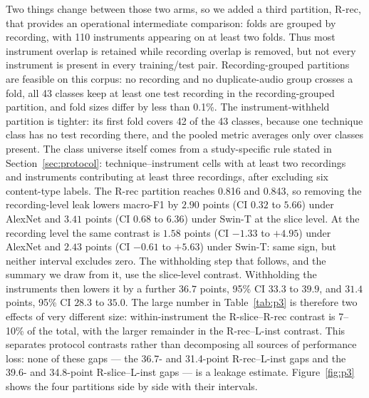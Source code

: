 Two things change between those two arms, so we added a third partition, R-rec, that
provides an operational intermediate comparison: folds are grouped by recording, with 110
instruments appearing on at least two folds. Thus most instrument overlap is retained while
recording overlap is removed, but not every instrument is present in every training/test pair.
Recording-grouped partitions are feasible on this corpus: no recording and no duplicate-audio group
crosses a fold, all 43 classes keep at least one test recording in the recording-grouped partition,
and fold sizes differ by less than 0.1\%. The instrument-withheld partition is tighter: its first
fold covers 42 of the 43 classes, because one technique class has no test recording there, and the
pooled metric averages only over classes present. The class universe itself comes from a
study-specific rule stated in Section~\ref{sec:protocol}: technique--instrument cells with at least
two recordings and instruments contributing at least three recordings, after excluding six
content-type labels. The R-rec partition reaches 0.816
and 0.843, so removing the recording-level leak lowers macro-F1 by $2.90$ points
(CI $0.32$ to $5.66$) under AlexNet and $3.41$ points (CI $0.68$ to $6.36$) under Swin-T at the
slice level. At the recording level the same contrast is $1.58$ points (CI $-1.33$ to $+4.95$)
under AlexNet and $2.43$ points (CI $-0.61$ to $+5.63$) under Swin-T: same sign, but neither
interval excludes zero. The withholding step that follows, and the summary we draw from it, use
the slice-level contrast.
Withholding the instruments then lowers it by a further $36.7$ points, 95\% CI $33.3$ to
$39.9$, and $31.4$ points, 95\% CI $28.3$ to $35.0$. The large number in
Table~\ref{tab:p3} is therefore two effects of very different size: within-instrument
the R-slice--R-rec contrast is 7--10\% of the total, with the larger remainder in the
R-rec--L-inst contrast. This separates protocol contrasts rather than decomposing
all sources of performance loss: none of these gaps --- the 36.7- and 31.4-point R-rec--L-inst
gaps and the 39.6- and 34.8-point R-slice--L-inst gaps --- is a leakage estimate.
Figure~\ref{fig:p3} shows the four partitions side by side with their intervals.

